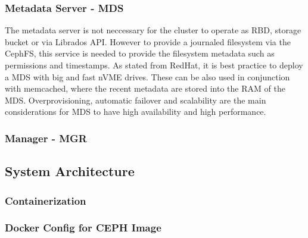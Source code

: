 \documentclass[titlepage, a4paper, 11pt]{scrartcl}
\begin{document}
            \subsubsection{Metadata Server - MDS}

                The metadata server is not neccessary for the cluster to operate as RBD, storage bucket or via Librados API.
                However to provide a journaled filesystem via the CephFS, this service is needed to provide the filesystem metadata such
                as permissions and timestamps. As stated from RedHat, it is best practice to deploy a MDS with big and fast nVME drives\cite{redhatstudy}.
                These can be also used in conjunction with memcached, where the recent metadata are stored into the RAM of the MDS.
                Overprovisioning, automatic failover and scalability are the main considerations for MDS to have high availability and high performance.

            \subsubsection{Manager - MGR}   
            
                


        \subsection{System Architecture}


            \subsubsection{Containerization}\label{system:containerization}


            \subsubsection{Docker Config for CEPH Image}

\end{document}
